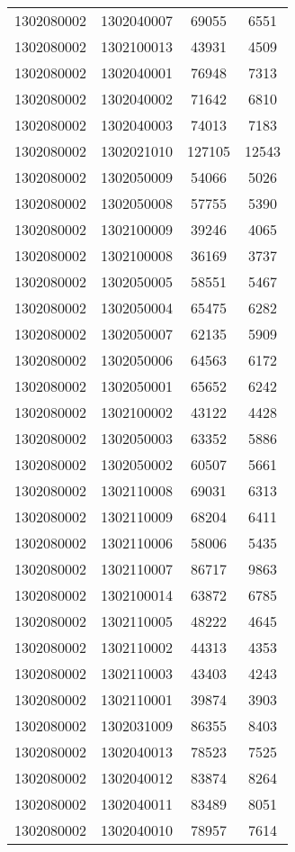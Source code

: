 \begin{longtable}[h]{llcc}
		1302080002 & 1302040007 & 69055 & 6551\\
		1302080002 & 1302100013 & 43931 & 4509\\
		1302080002 & 1302040001 & 76948 & 7313\\
		1302080002 & 1302040002 & 71642 & 6810\\
		1302080002 & 1302040003 & 74013 & 7183\\
		1302080002 & 1302021010 & 127105 & 12543\\
		1302080002 & 1302050009 & 54066 & 5026\\
		1302080002 & 1302050008 & 57755 & 5390\\
		1302080002 & 1302100009 & 39246 & 4065\\
		1302080002 & 1302100008 & 36169 & 3737\\
		1302080002 & 1302050005 & 58551 & 5467\\
		1302080002 & 1302050004 & 65475 & 6282\\
		1302080002 & 1302050007 & 62135 & 5909\\
		1302080002 & 1302050006 & 64563 & 6172\\
		1302080002 & 1302050001 & 65652 & 6242\\
		1302080002 & 1302100002 & 43122 & 4428\\
		1302080002 & 1302050003 & 63352 & 5886\\
		1302080002 & 1302050002 & 60507 & 5661\\
		1302080002 & 1302110008 & 69031 & 6313\\
		1302080002 & 1302110009 & 68204 & 6411\\
		1302080002 & 1302110006 & 58006 & 5435\\
		1302080002 & 1302110007 & 86717 & 9863\\
		1302080002 & 1302100014 & 63872 & 6785\\
		1302080002 & 1302110005 & 48222 & 4645\\
		1302080002 & 1302110002 & 44313 & 4353\\
		1302080002 & 1302110003 & 43403 & 4243\\
		1302080002 & 1302110001 & 39874 & 3903\\
		1302080002 & 1302031009 & 86355 & 8403\\
		1302080002 & 1302040013 & 78523 & 7525\\
		1302080002 & 1302040012 & 83874 & 8264\\
		1302080002 & 1302040011 & 83489 & 8051\\
		1302080002 & 1302040010 & 78957 & 7614\\

\end{longtable}

